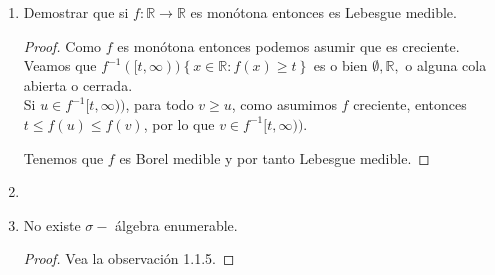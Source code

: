 \documentclass[spanish,12pt,a4paper,openany]{book}
\begin{document}
\begin{enumerate}
\begin{proof}
					Así, podemos ver que si $I$ es una n-celda en $\mathbb{R}^{n}$, entonces $\mu^{*}(I) = \prod_{k=1}^{n} \mu(\lambda(a_{1}^{j}, b_{k}^{j})) = \prod_{k=1}^{n} |\lambda|(b_{k}^{j} - a_{k}^{j}) = |\lambda|^{n} \mu(I).$ De modo que si $\bigcup _{k = 1} ^{\infty} I_{k}$ es un cubrimiento por n-celdas de $M$, entonces $\bigcup _{k = 1} ^{\infty} \lambda I_{k}$ es un cubrimiento por n-celdas de $\lambda M$, e 
					\begin{align*}
						\inf \displaystyle \left\{ \sum_{k=1}^{\infty} \mu^{*} (\lambda I_{k}) : \lambda M \subset \bigcup_{i=1}  \lambda I_{k}^{\infty}\right\}
						&= \inf \displaystyle \left\{ \sum_{k=1}^{\infty} |\lambda|^{n} \mu^{*}(I_{k}) : M \subset \bigcup_{i=1}^{\infty}  I_{k}\right\}\\				
						&= \inf \displaystyle \left\{|\lambda|^{n} \sum_{k=1}^{\infty} \mu^{*}(I_{k}) :  M \subset \bigcup_{i=1}^{\infty} I_{k} \right\}\\
						&= |\lambda|^{n} \inf \displaystyle \left\{\sum_{k=1}^{\infty} \mu^{*}(I_{k}): M \subset \bigcup_{i=1}^{\infty} I_{k}\right\}\\
						&= |\lambda|^{n} \mu^{*}(M)
					\end{align*}
				\end{proof}
			
			\item Demostrar que si $f: \mathbb{R} \rightarrow \mathbb{R}$ es monótona entonces es Lebesgue medible.
				
				\begin{proof}
					Como $f$ es monótona entonces podemos asumir que es creciente. Veamos que $f^{-1}([t, \infty)) \left\{x \in \mathbb{R} : f(x) \geq t \right\}$ es o bien $\emptyset, \mathbb{R},$ o alguna cola abierta o cerrada.\\
					
					Si $u \in f^{-1}[t, \infty))$, para todo $v \geq u$, como asumimos $f$ creciente, entonces $t \leq f(u) \leq f(v)$, por lo que $v \in f^{-1}[t, \infty))$.
					
					Tenemos que $f$ es Borel medible y por tanto Lebesgue medible.
					
				\end{proof}
				
			\item 
			
			\item No existe $\sigma-$ álgebra enumerable.
			
				\begin{proof}
					Vea la observación 1.1.5.
				\end{proof}
			

\end{enumerate}
\end{document}
